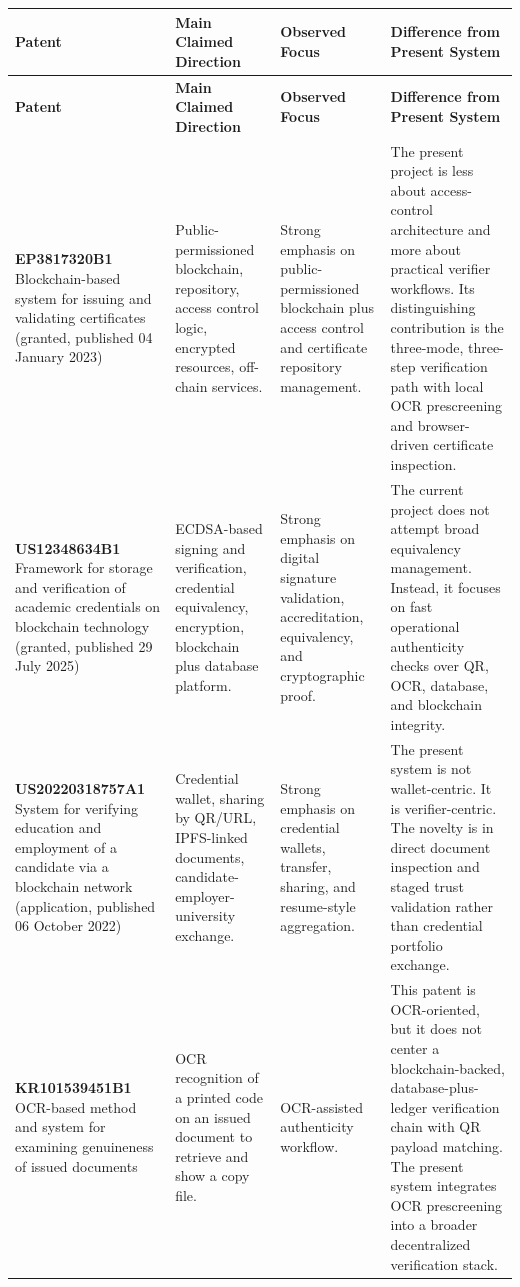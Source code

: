 \documentclass[12pt,a4paper]{article}
\begin{document}
\begin{longtable}{p{3cm}p{4cm}p{5.2cm}p{3.4cm}}
\toprule
\textbf{Patent} & \textbf{Main Claimed Direction} & \textbf{Observed Focus} & \textbf{Difference from Present System} \\
\midrule
\endfirsthead
\toprule
\textbf{Patent} & \textbf{Main Claimed Direction} & \textbf{Observed Focus} & \textbf{Difference from Present System} \\
\midrule
\endhead
\textbf{EP3817320B1} \newline Blockchain-based system for issuing and validating certificates (granted, published 04 January 2023) & Public-permissioned blockchain, repository, access control logic, encrypted resources, off-chain services. & Strong emphasis on public-permissioned blockchain plus access control and certificate repository management. & The present project is less about access-control architecture and more about practical verifier workflows. Its distinguishing contribution is the three-mode, three-step verification path with local OCR prescreening and browser-driven certificate inspection. \\

\textbf{US12348634B1} \newline Framework for storage and verification of academic credentials on blockchain technology (granted, published 29 July 2025) & ECDSA-based signing and verification, credential equivalency, encryption, blockchain plus database platform. & Strong emphasis on digital signature validation, accreditation, equivalency, and cryptographic proof. & The current project does not attempt broad equivalency management. Instead, it focuses on fast operational authenticity checks over QR, OCR, database, and blockchain integrity. \\

\textbf{US20220318757A1} \newline System for verifying education and employment of a candidate via a blockchain network (application, published 06 October 2022) & Credential wallet, sharing by QR/URL, IPFS-linked documents, candidate-employer-university exchange. & Strong emphasis on credential wallets, transfer, sharing, and resume-style aggregation. & The present system is not wallet-centric. It is verifier-centric. The novelty is in direct document inspection and staged trust validation rather than credential portfolio exchange. \\

\textbf{KR101539451B1} \newline OCR-based method and system for examining genuineness of issued documents & OCR recognition of a printed code on an issued document to retrieve and show a copy file. & OCR-assisted authenticity workflow. & This patent is OCR-oriented, but it does not center a blockchain-backed, database-plus-ledger verification chain with QR payload matching. The present system integrates OCR prescreening into a broader decentralized verification stack. \\


\end{longtable}
\end{document}

